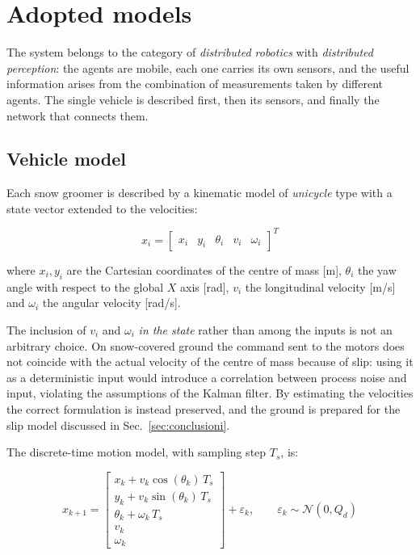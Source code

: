 \documentclass[conference,9pt]{IEEEtran}
\begin{document}
\section{Adopted models}
\label{sec:modelli}

The system belongs to the category of \emph{distributed robotics} with
\emph{distributed perception}: the agents are mobile, each one carries its own
sensors, and the useful information arises from the combination of measurements
taken by different agents. The single vehicle is described first, then its
sensors, and finally the network that connects them.

\subsection{Vehicle model}

Each snow groomer is described by a kinematic model of \emph{unicycle} type
with a state vector extended to the velocities:

\begin{equation}
x_i = \begin{bmatrix} x_i & y_i & \theta_i & v_i & \omega_i \end{bmatrix}^T
\label{eq:stato}
\end{equation}

where $x_i, y_i$ are the Cartesian coordinates of the centre of mass [m],
$\theta_i$ the yaw angle with respect to the global $X$ axis [rad], $v_i$ the
longitudinal velocity [m/s] and $\omega_i$ the angular velocity [rad/s].

The inclusion of $v_i$ and $\omega_i$ \emph{in the state} rather than among the
inputs is not an arbitrary choice. On snow-covered ground the command sent to
the motors does not coincide with the actual velocity of the centre of mass
because of slip: using it as a deterministic input would introduce a
correlation between process noise and input, violating the assumptions of the
Kalman filter. By estimating the velocities the correct formulation is instead
preserved, and the ground is prepared for the slip model discussed in
Sec.~\ref{sec:conclusioni}.

The discrete-time motion model, with sampling step $T_s$, is:

\begin{equation}
x_{k+1} =
\begin{bmatrix}
x_k + v_k \cos(\theta_k)\,T_s\\
y_k + v_k \sin(\theta_k)\,T_s\\
\theta_k + \omega_k\,T_s\\
v_k\\
\omega_k
\end{bmatrix}
+ \varepsilon_k, \qquad \varepsilon_k \sim \mathcal{N}(0, Q_d)
\label{eq:moto}
\end{equation}
\end{document}
